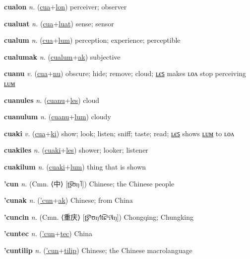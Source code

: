 \textbf{\hypertarget{cualon}{cualon}} \textit{n.} (\hyperlink{cua}{cua}+\allowbreak \hyperlink{lon}{lon})
perceiver; observer

\textbf{\hypertarget{cualuat}{cualuat}} \textit{n.} (\hyperlink{cua}{cua}+\allowbreak \hyperlink{luat}{luat})
sense; sensor

\textbf{\hypertarget{cualum}{cualum}} \textit{n.} (\hyperlink{cua}{cua}+\allowbreak \hyperlink{lum}{lum})
perception; experience; perceptible

\textbf{\hypertarget{cualumak}{cualumak}} \textit{n.} (\hyperlink{cualum}{cualum}+\allowbreak \hyperlink{ak}{ak})
subjective

\textbf{\hypertarget{cuanu}{cuanu}} \textit{v.} (\hyperlink{cua}{cua}+\allowbreak \hyperlink{nu}{nu})
obscure; hide; remove; cloud; \hyperlink{cuanules}{ʟєꜱ} makes ʟᴏᴧ stop perceiving \hyperlink{cuanulum}{ʟᴜᴍ}

\textbf{\hypertarget{cuanules}{cuanules}} \textit{n.} (\hyperlink{cuanu}{cuanu}+\allowbreak \hyperlink{les}{les})
cloud

\textbf{\hypertarget{cuanulum}{cuanulum}} \textit{n.} (\hyperlink{cuanu}{cuanu}+\allowbreak \hyperlink{lum}{lum})
cloudy

\textbf{\hypertarget{cuaki}{cuaki}} \textit{v.} (\hyperlink{cua}{cua}+\allowbreak \hyperlink{ki}{ki})
show; look; listen; sniff; taste; read; \hyperlink{cuakiles}{ʟєꜱ} shows \hyperlink{cuakilum}{ʟᴜᴍ} to ʟᴏᴧ

\textbf{\hypertarget{cuakiles}{cuakiles}} \textit{n.} (\hyperlink{cuaki}{cuaki}+\allowbreak \hyperlink{les}{les})
shower; looker; listener

\textbf{\hypertarget{cuakilum}{cuakilum}} \textit{n.} (\hyperlink{cuaki}{cuaki}+\allowbreak \hyperlink{lum}{lum})
thing that is shown

\textbf{\hypertarget{'cun}{'cun}} \textit{n.} (Cmn. ⟨{\chinese{}中}⟩ [ʈ͡ʂʊŋ˥])
Chinese; the Chinese people

\textbf{\hypertarget{'cunak}{'cunak}} \textit{n.} (\hyperlink{'cun}{'cun}+\allowbreak \hyperlink{ak}{ak})
Chinese; from China

\textbf{\hypertarget{'cuncin}{'cuncin}} \textit{n.} (Cmn. ⟨{\chinese{}重庆}⟩ [ʈ͡ʂʰʊŋ˧˥t͡ɕʰi˥˩ŋ])
Chongqing; Chungking

\textbf{\hypertarget{'cuntec}{'cuntec}} \textit{n.} (\hyperlink{'cun}{'cun}+\allowbreak \hyperlink{tec}{tec})
China

\textbf{\hypertarget{'cuntilip}{'cuntilip}} \textit{n.} (\hyperlink{'cun}{'cun}+\allowbreak \hyperlink{tilip}{tilip})
Chinese; the Chinese macrolanguage

